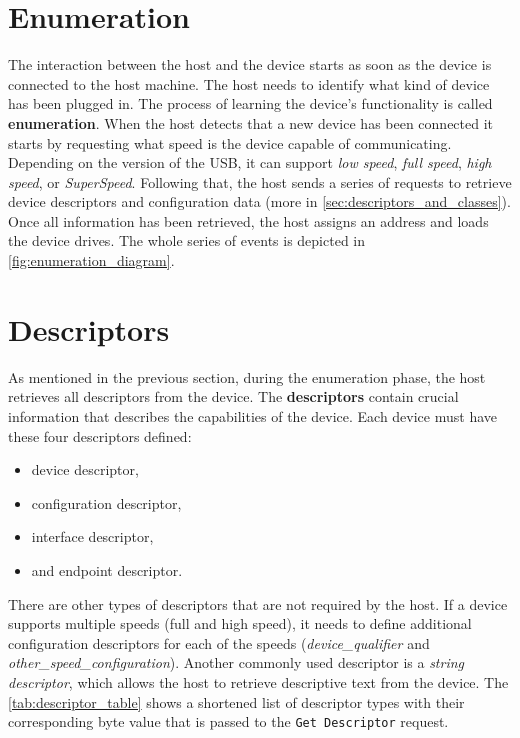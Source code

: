 \section{Enumeration}
\label{sec:enumeration}
The interaction between the host and the device starts as soon as the device is connected to the host machine. The host needs to identify what kind of device has been plugged in. The process of learning the device's functionality is called \textbf{enumeration}. When the host detects that a new device has been connected it starts by requesting what speed is the device capable of communicating. Depending on the version of the USB, it can support \emph{low speed}, \emph{full speed}, \emph{high speed}, or \emph{SuperSpeed}. Following that, the host sends a series of requests to retrieve device descriptors and configuration data (more in \autoref{sec:descriptors_and_classes}). Once all information has been retrieved, the host assigns an address and loads the device drives. The whole series of events is depicted in \autoref{fig:enumeration_diagram}.

\section{Descriptors}
\label{sec:descriptors}

As mentioned in the previous section, during the enumeration phase, the host retrieves all descriptors from the device. The \textbf{descriptors} contain crucial information that describes the capabilities of the device. Each device must have these four descriptors defined:
\begin{itemize}
    \item device descriptor,
    \item configuration descriptor,
    \item interface descriptor,
    \item and endpoint descriptor.
\end{itemize}

There are other types of descriptors that are not required by the host. If a device supports multiple speeds (full and high speed), it needs to define additional configuration descriptors for each of the speeds (\emph{device\_qualifier} and \emph{other\_speed\_configuration}). Another commonly used descriptor is a \emph{string descriptor}, which allows the host to retrieve descriptive text from the device. The \autoref{tab:descriptor_table} shows a shortened list of descriptor types with their corresponding byte value that is passed to the \verb|Get Descriptor| request.

